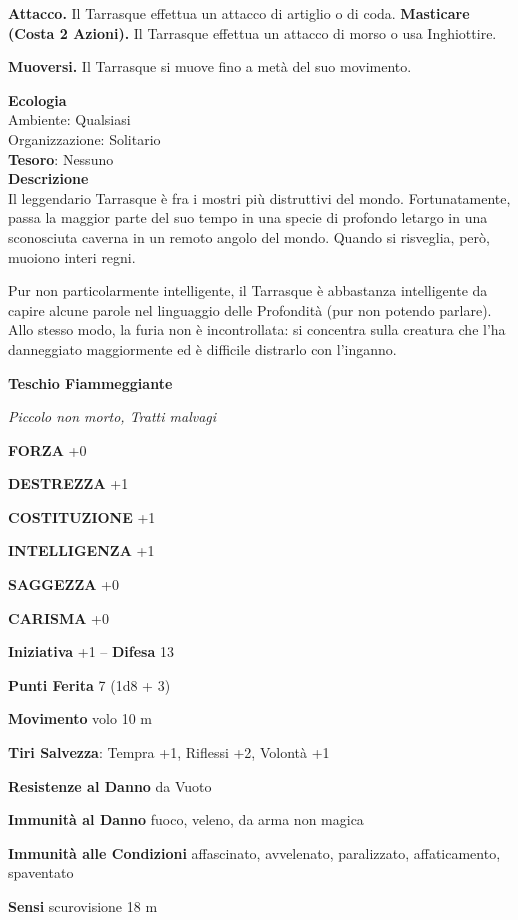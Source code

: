 \begin{multicols}{2}
	\textbf{Attacco.} Il Tarrasque effettua un attacco di artiglio o di coda. \textbf{Masticare (Costa 2 Azioni).} Il Tarrasque effettua un attacco di morso o usa Inghiottire.

	\textbf{Muoversi.} Il Tarrasque si muove fino a metà del suo movimento.

	\textbf{Ecologia}\\
	Ambiente: Qualsiasi\\
	Organizzazione: Solitario\\
	\textbf{Tesoro}: Nessuno\\
	\textbf{Descrizione}\\
	Il leggendario Tarrasque è fra i mostri più distruttivi del mondo. Fortunatamente, passa la maggior parte del suo tempo in una specie di profondo letargo in una sconosciuta caverna in un remoto angolo del mondo. Quando si risveglia, però, muoiono interi regni.

	Pur non particolarmente intelligente, il Tarrasque è abbastanza intelligente da capire alcune parole nel linguaggio delle Profondità (pur non potendo parlare). Allo stesso modo, la furia non è incontrollata: si concentra sulla creatura che l'ha danneggiato maggiormente ed è difficile distrarlo con l'inganno.

	\medskip{}\textbf{Teschio Fiammeggiante}

	\textit{Piccolo non morto, Tratti malvagi}

	\textbf{FORZA} +0

	\textbf{DESTREZZA} +1

	\textbf{COSTITUZIONE} +1

	\textbf{INTELLIGENZA} +1

	\textbf{SAGGEZZA} +0

	\textbf{CARISMA} +0

	\textbf{Iniziativa} +1 -- \textbf{Difesa} 13

	\textbf{Punti Ferita} 7 (1d8 + 3)

	\textbf{Movimento} volo 10 m

	\textbf{Tiri Salvezza}: Tempra +1, Riflessi +2, Volontà +1

	\textbf{Resistenze al Danno} da Vuoto

	\textbf{Immunità al Danno} fuoco, veleno, da arma non magica

	\textbf{Immunità alle Condizioni} affascinato, avvelenato, paralizzato, affaticamento, spaventato

	\textbf{Sensi} scurovisione 18 m


\end{multicols}

